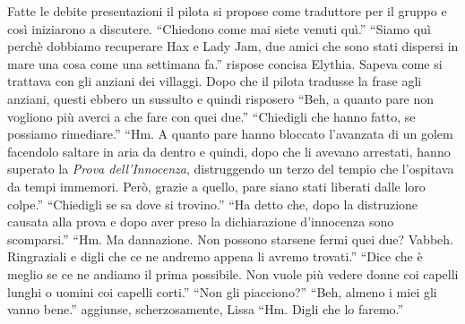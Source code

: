     Fatte le debite presentazioni il pilota si propose come traduttore per
    il gruppo e così iniziarono a discutere. ``Chiedono come mai siete
    venuti quì.'' ``Siamo quì perchè dobbiamo recuperare Hax e Lady Jam,
    due amici che sono stati dispersi in mare una cosa come una settimana
    fa.'' rispose concisa Elythia. Sapeva come si trattava con gli anziani
    dei villaggi. Dopo che il pilota tradusse la frase agli anziani, questi
    ebbero un sussulto e quindi risposero ``Beh, a quanto pare non vogliono
    più averci a che fare con quei due.'' ``Chiedigli che hanno fatto, se
    possiamo rimediare.'' ``Hm. A quanto pare hanno bloccato l'avanzata di
    un golem facendolo saltare in aria da dentro e quindi, dopo che li
    avevano arrestati, hanno superato la \emph{Prova dell'Innocenza},
    distruggendo un terzo del tempio che l'ospitava da tempi immemori.
    Però, grazie a quello, pare siano stati liberati dalle loro colpe.''
    ``Chiedigli se sa dove si trovino.'' ``Ha detto che, dopo la
    distruzione causata alla prova e dopo aver preso la dichiarazione
    d'innocenza sono scomparsi.'' ``Hm. Ma dannazione. Non possono starsene
    fermi quei due? Vabbeh. Ringraziali e digli che ce ne andremo appena li
    avremo trovati.'' ``Dice che è meglio se ce ne andiamo il prima
    possibile. Non vuole più vedere donne coi capelli lunghi o uomini coi
    capelli corti.'' ``Non gli piacciono?'' ``Beh, almeno i miei gli vanno
    bene.'' aggiunse, scherzosamente, Lissa ``Hm. Digli che lo faremo.''

